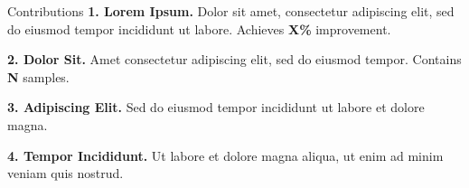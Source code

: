 \begin{contribblock}{Contributions}
\textbf{1. Lorem Ipsum.} Dolor sit amet, consectetur adipiscing elit, sed do eiusmod tempor incididunt ut labore. Achieves \textbf{X\%} improvement.

\vspace{0.4em}
\textbf{2. Dolor Sit.} Amet consectetur adipiscing elit, sed do eiusmod tempor. Contains \textbf{N} samples.

\vspace{0.4em}
\textbf{3. Adipiscing Elit.} Sed do eiusmod tempor incididunt ut labore et dolore magna.

\vspace{0.4em}
\textbf{4. Tempor Incididunt.} Ut labore et dolore magna aliqua, ut enim ad minim veniam quis nostrud.
\end{contribblock}
